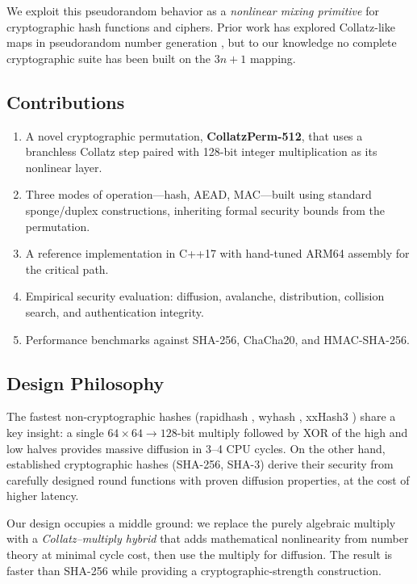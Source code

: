 \documentclass[11pt,a4paper]{article}
\begin{document}
We exploit this pseudorandom behavior as a \emph{nonlinear mixing
primitive} for cryptographic hash functions and ciphers. Prior work has
explored Collatz-like maps in pseudorandom number generation
\cite{lagarias1985}, but to our knowledge no complete cryptographic suite
has been built on the $3n+1$ mapping.

\subsection{Contributions}

\begin{enumerate}
    \item A novel cryptographic permutation, \textbf{CollatzPerm-512},
          that uses a branchless Collatz step paired with 128-bit
          integer multiplication as its nonlinear layer.
    \item Three modes of operation---hash, AEAD, MAC---built using
          standard sponge/duplex constructions, inheriting formal
          security bounds from the permutation.
    \item A reference implementation in C++17 with hand-tuned ARM64
          assembly for the critical path.
    \item Empirical security evaluation: diffusion, avalanche,
          distribution, collision search, and authentication integrity.
    \item Performance benchmarks against SHA-256, ChaCha20, and
          HMAC-SHA-256.
\end{enumerate}

\subsection{Design Philosophy}

The fastest non-cryptographic hashes (rapidhash \cite{rapidhash},
wyhash \cite{wyhash}, xxHash3 \cite{xxhash}) share a key insight: a
single $64 \times 64 \to 128$-bit multiply followed by XOR of the high
and low halves provides massive diffusion in 3--4 CPU cycles. On the
other hand, established cryptographic hashes (SHA-256, SHA-3) derive
their security from carefully designed round functions with proven
diffusion properties, at the cost of higher latency.

Our design occupies a middle ground: we replace the purely algebraic
multiply with a \emph{Collatz--multiply hybrid} that adds mathematical
nonlinearity from number theory at minimal cycle cost, then use the
multiply for diffusion. The result is faster than SHA-256 while providing
a cryptographic-strength construction.
\end{document}

